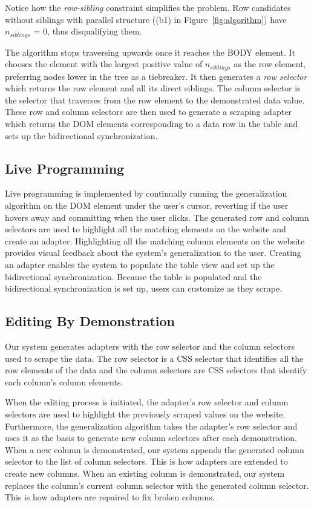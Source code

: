 \documentclass[sigconf,10pt]{acmart}
\begin{document}
Notice how the \emph{row-sibling} constraint simplifies the problem. Row
candidates without siblings with parallel structure ((b1) in
Figure~\ref{fig:algorithm}) have \(n_{siblings}\) = 0, thus
disqualifying them.

The algorithm stops traversing upwards once it reaches the BODY element.
It chooses the element with the largest positive value of
\(n_{siblings}\) as the row element, preferring nodes lower in the tree
as a tiebreaker. It then generates a \emph{row selector} which returns
the row element and all its direct siblings. The column selector is the
selector that traverses from the row element to the demonstrated data
value. These row and column selectors are then used to generate a
scraping adapter which returns the DOM elements corresponding to a data
row in the table and sets up the bidirectional synchronization.

\hypertarget{live-programming}{%
\subsection{Live Programming}\label{live-programming}}

Live programming is implemented by continually running the
generalization algorithm on the DOM element under the user's cursor,
reverting if the user hovers away and committing when the user clicks.
The generated row and column selectors are used to highlight all the
matching elements on the website and create an adapter. Highlighting all
the matching column elements on the website provides visual feedback
about the system's generalization to the user. Creating an adapter
enables the system to populate the table view and set up the
bidirectional synchronization. Because the table is populated and the
bidirectional synchronization is set up, users can customize as they
scrape.

\hypertarget{editing-by-demonstration}{%
\subsection{Editing By Demonstration}\label{editing-by-demonstration}}

Our system generates adapters with the row selector and the column
selectors used to scrape the data. The row selector is a CSS selector
that identifies all the row elements of the data and the column
selectors are CSS selectors that identify each column's column elements.

When the editing process is initiated, the adapter's row selector and
column selectors are used to highlight the previously scraped values on
the website. Furthermore, the generalization algorithm takes the
adapter's row selector and uses it as the basis to generate new column
selectors after each demonstration. When a new column is demonstrated,
our system appends the generated column selector to the list of column
selectors. This is how adapters are extended to create new columns. When
an existing column is demonstrated, our system replaces the column's
current column selector with the generated column selector. This is how
adapters are repaired to fix broken columns.
\end{document}
